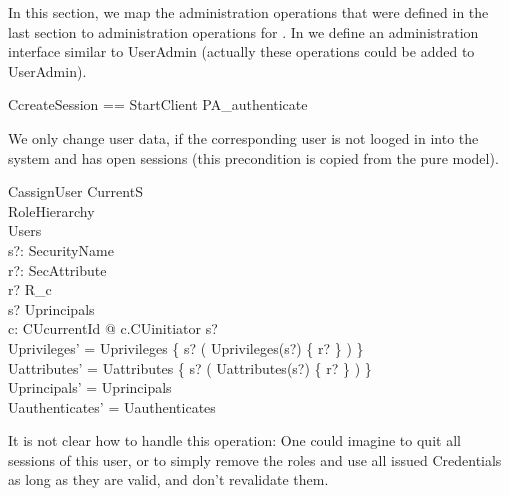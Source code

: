 In this section, we map the administration operations that were defined in the
last section to administration operations for \corbasec{}.  In \corba{} we
define an \rbaci{} administration interface similar to UserAdmin (actually these
operations could be added to UserAdmin).

\begin{zed}
  CcreateSession == StartClient \land PA\_authenticate \\
\end{zed}

We only change user data, if the corresponding user is not looged in into the
system and has open sessions (this precondition is copied from the pure \rbaci{}
model).
\begin{schema}{CassignUser}
  \Xi CurrentS \\
  \Xi RoleHierarchy \\
  \Delta Users \\
  s?: SecurityName \\
  r?: SecAttribute \\
  \where
  r? \in R_{c} \\
  s? \in Uprincipals \\

  \forall c: \ran CUcurrentId @ c.CUinitiator \neq s? \\

  Uprivileges' = Uprivileges \oplus \{ s? \mapsto ( Uprivileges(s?) \cup \{ r?
  \} ) \} \\
  Uattributes' = Uattributes \oplus \{ s? \mapsto ( Uattributes(s?) \cup \{ r?
  \} ) \} \\
  Uprincipals' = Uprincipals \\
  Uauthenticates' = Uauthenticates \\
\end{schema}

It is not clear how to handle this operation:  One could imagine to quit all
sessions of this user, or to simply remove the roles and use all issued
Credentials as long as they are valid, and don't revalidate them.
  

